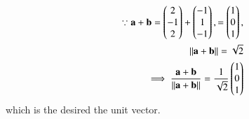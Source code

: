 \begin{align}
	\because \mathbf a + \mathbf b = \begin{pmatrix} 2\\-1\\2 \end{pmatrix} + \begin{pmatrix} -1\\1\\-1 \end{pmatrix},
= \begin{pmatrix} 1\\0\\1 \end{pmatrix},
\\
	\left\lVert\mathbf a + \mathbf b \right\rVert = \sqrt{2}
	\\
	\implies \frac{\mathbf a + \mathbf b }{\left\lVert\mathbf a + \mathbf b \right\rVert} = \frac{1}{\sqrt{2}}\begin{pmatrix} 1\\0\\1 \end{pmatrix}
\end{align}
which is the desired the unit vector.




